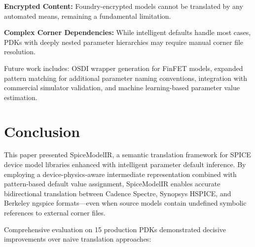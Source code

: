 \documentclass[conference]{IEEEtran}
\begin{document}
\textbf{Encrypted Content:} Foundry-encrypted models cannot be translated by any automated means, remaining a fundamental limitation.

\textbf{Complex Corner Dependencies:} While intelligent defaults handle most cases, PDKs with deeply nested parameter hierarchies may require manual corner file resolution.

Future work includes: OSDI wrapper generation for FinFET models, expanded pattern matching for additional parameter naming conventions, integration with commercial simulator validation, and machine learning-based parameter value estimation.

\section{Conclusion}
\label{sec:conclusion}

This paper presented SpiceModelIR, a semantic translation framework for SPICE device model libraries enhanced with intelligent parameter default inference. By employing a device-physics-aware intermediate representation combined with pattern-based default value assignment, SpiceModelIR enables accurate bidirectional translation between Cadence Spectre, Synopsys HSPICE, and Berkeley ngspice formats---even when source models contain undefined symbolic references to external corner files.

Comprehensive evaluation on 15 production PDKs demonstrated decisive improvements over naive translation approaches:
\end{document}
